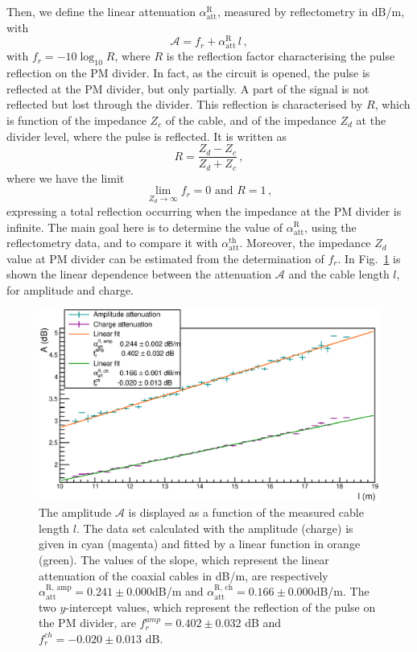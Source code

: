Then, we define the linear attenuation $\alpha_{\text{att}}^{\text{R}}$, measured by reflectometry in dB/m, with
\begin{equation}
  \mathcal{A} = f_{r}+\alpha_{\text{att}}^{\text{R}}\,l\,,
\end{equation}
with $f_{r} = -10\log_{10}R$, where $R$ is the reflection factor characterising the pulse reflection on the PM divider.
In fact, as the circuit is opened, the pulse is reflected at the PM divider, but only partially.
A part of the signal is not reflected but lost through the divider.
This reflection is characterised by $R$, which is function of the impedance $Z_{c}$ of the cable, and of the impedance $Z_{d}$ at the divider level, where the pulse is reflected.
It is written as
\begin{equation}
  R = \frac{Z_{d}-Z_{c}}{Z_{d}+Z_{c}}\,,
\end{equation}
where we have the limit
\begin{equation}
  \lim_{Z_{d} \to \infty} f_{r} = 0 \text{ and } R=1\,,
\end{equation}
expressing a total reflection occurring when the impedance at the PM divider is infinite.
The main goal here is to determine the value of $\alpha_{\text{att}}^{\text{R}}$, using the reflectometry data, and to compare it with $\alpha_{\text{att}}^{\text{th}}$.
Moreover, the impedance $Z_{d}$ value at PM divider can be estimated from the determination of $f_{r}$.
In Fig.~\ref{fig:attenuation} is shown the linear dependence between the attenuation $\mathcal{A}$ and the cable length $l$, for amplitude and charge.
\begin{figure}[h!]
  \centering
  \includegraphics[width=15cm]{commissioning/fig_commissioning/attenuation_length.eps}
  \caption{The amplitude $\mathcal{A}$ is displayed as a function of the measured cable length $l$.
    The data set calculated with the amplitude (charge) is given in cyan (magenta) and fitted by a linear function in orange (green).
    The values of the slope, which represent the linear attenuation of the coaxial cables in dB/m, are respectively $\alpha_{\text{att}}^{\text{R, amp}} = 0.241\pm 0.000$dB/m and $\alpha_{\text{att}}^{\text{R, ch}} = 0.166\pm0.000$dB/m.
    The two $y$-intercept values, which represent the reflection of the pulse on the PM divider, are $f_{r}^{amp} = 0.402\pm 0.032$ dB and $f_{r}^{ch} = -0.020\pm 0.013$ dB.
    \label{fig:attenuation}}
\end{figure}
